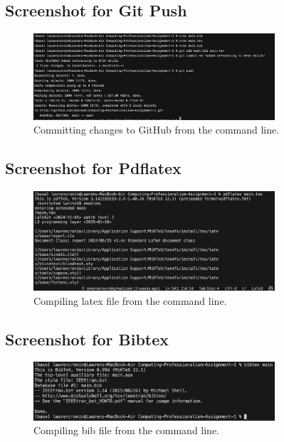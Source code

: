 \documentclass[a4paper, 11pt]{report}
\begin{document}
\subsection{Screenshot for Git Push}
\begin{figure}[h]
    \centering
    \includegraphics[width=0.8\textwidth]{github.png}
    \caption{Committing changes to GitHub from the command line.}
    \label{fig:my_label}
\end{figure}

\subsection{Screenshot for Pdflatex}
\begin{figure}[h]
    \centering
    \includegraphics[width=0.8\textwidth]{pdflatex.png}
    \caption{Compiling latex file from the command line.}
    \label{fig:my_label}
\end{figure}

\subsection{Screenshot for Bibtex}
\begin{figure}[h]
    \centering
    \includegraphics[width=0.8\textwidth]{bibtex.png}
    \caption{Compiling bib file from the command line.}
    \label{fig:my_label}
\end{figure}
\end{document}
